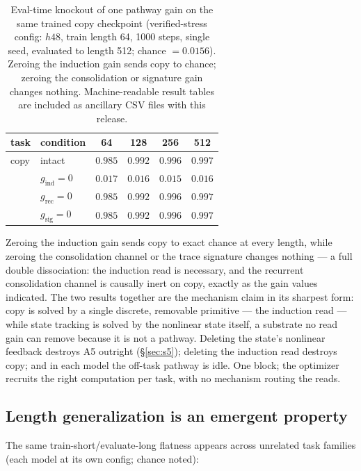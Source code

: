 \documentclass[11pt]{article}
\begin{document}
\begin{table}[h]
\centering
\caption{Eval-time knockout of one pathway gain on the same trained copy
checkpoint (verified-stress config: $h48$, train length 64, 1000 steps, single
seed, evaluated to length 512; chance $= 0.0156$). Zeroing the induction gain
sends copy to chance; zeroing the consolidation or signature gain changes
nothing. Machine-readable result tables are included as ancillary CSV files
with this release.}
\label{tab:knockout}
\small
\begin{tabular}{llcccc}
\toprule
task & condition & 64 & 128 & 256 & 512 \\
\midrule
copy & intact & $0.985$ & $0.992$ & $0.996$ & $0.997$ \\
 & $g_{\mathrm{ind}} = 0$ & $\mathbf{0.017}$ & $\mathbf{0.016}$ & $\mathbf{0.015}$ & $\mathbf{0.016}$ \\
 & $g_{\mathrm{rec}} = 0$ & $0.985$ & $0.992$ & $0.996$ & $0.997$ \\
 & $g_{\mathrm{sig}} = 0$ & $0.985$ & $0.992$ & $0.996$ & $0.997$ \\
\bottomrule
\end{tabular}
\end{table}

Zeroing the induction gain sends copy to exact chance at every length, while
zeroing the consolidation channel or the trace signature changes nothing --- a
full double dissociation: the induction read is necessary, and the recurrent
consolidation channel is causally inert on copy, exactly as the gain values
indicated. The two results together are the mechanism claim in its sharpest
form: copy is solved by a single discrete, removable primitive --- the
induction read --- while state tracking is solved by the nonlinear state
itself, a substrate no read gain can remove because it is not a pathway.
Deleting the state's nonlinear feedback destroys A5 outright (\S\ref{sec:s5});
deleting the induction read destroys copy; and in each model the off-task
pathway is idle. One block; the optimizer recruits the right computation per
task, with no mechanism routing the reads.

\subsection{Length generalization is an emergent property}
\label{sec:emergent}

The same train-short/evaluate-long flatness appears across unrelated task
families (each model at its own config; chance noted):
\end{document}
